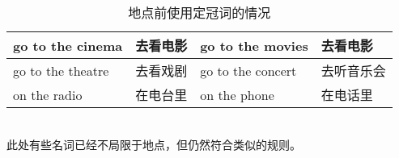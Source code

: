 \documentclass[UTF8]{ctexart}
\begin{document}
    \begin{table}[h]
        \begin{center}
            \ttfamily
            \begin{tabular}{p{110pt}|p{60pt}|p{110pt}|p{60pt}}
                \hline
                go to the cinema&去看电影&go to the movies&去看电影\\ \hline
                go to the theatre&去看戏剧&go to the concert&去听音乐会\\ \hline
                on the radio&在电台里&on the phone&在电话里\\ \hline
            \end{tabular}
            \rmfamily
            \caption{地点前使用定冠词的情况}
        \end{center}
    \end{table}\\
    此处有些名词已经不局限于地点，但仍然符合类似的规则。

\newpage
\end{document}
